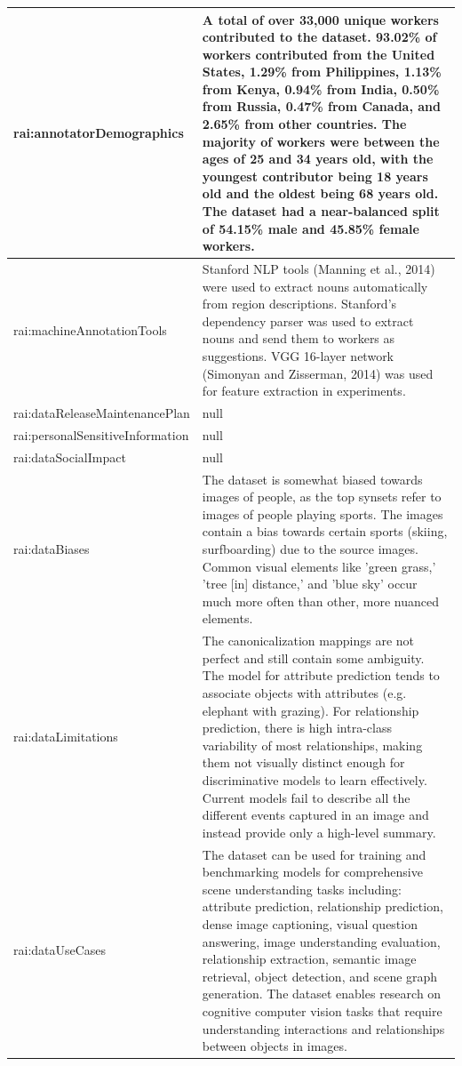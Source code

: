 \documentclass[10pt,a4paper]{article}
\begin{document}
\begin{longtable}{|p{4cm}|p{12cm}|}
\hline
rai:annotatorDemographics & A total of over 33,000 unique workers contributed to the dataset. 93.02\% of workers contributed from the United States, 1.29\% from Philippines, 1.13\% from Kenya, 0.94\% from India, 0.50\% from Russia, 0.47\% from Canada, and 2.65\% from other countries. The majority of workers were between the ages of 25 and 34 years old, with the youngest contributor being 18 years old and the oldest being 68 years old. The dataset had a near-balanced split of 54.15\% male and 45.85\% female workers. \\
\hline
rai:machineAnnotationTools & Stanford NLP tools (Manning et al., 2014) were used to extract nouns automatically from region descriptions. Stanford's dependency parser was used to extract nouns and send them to workers as suggestions. VGG 16-layer network (Simonyan and Zisserman, 2014) was used for feature extraction in experiments. \\
\hline
rai:dataReleaseMaintenancePlan & null \\
\hline
rai:personalSensitiveInformation & null \\
\hline
rai:dataSocialImpact & null \\
\hline
rai:dataBiases & The dataset is somewhat biased towards images of people, as the top synsets refer to images of people playing sports. The images contain a bias towards certain sports (skiing, surfboarding) due to the source images. Common visual elements like 'green grass,' 'tree [in] distance,' and 'blue sky' occur much more often than other, more nuanced elements. \\
\hline
rai:dataLimitations & The canonicalization mappings are not perfect and still contain some ambiguity. The model for attribute prediction tends to associate objects with attributes (e.g. elephant with grazing). For relationship prediction, there is high intra-class variability of most relationships, making them not visually distinct enough for discriminative models to learn effectively. Current models fail to describe all the different events captured in an image and instead provide only a high-level summary. \\
\hline
rai:dataUseCases & The dataset can be used for training and benchmarking models for comprehensive scene understanding tasks including: attribute prediction, relationship prediction, dense image captioning, visual question answering, image understanding evaluation, relationship extraction, semantic image retrieval, object detection, and scene graph generation. The dataset enables research on cognitive computer vision tasks that require understanding interactions and relationships between objects in images. \\
\hline
\end{longtable}
\end{document}
